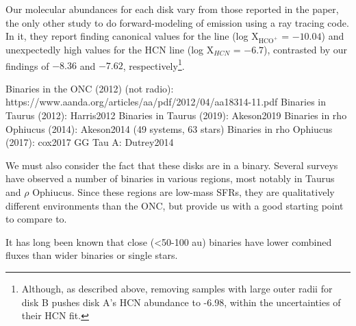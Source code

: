 Our molecular abundances for each disk vary from those reported in the \citet{Factor2017} paper, the only other study to do forward-modeling of \hco emission using a ray tracing code. In it, they report finding canonical values for the \hco line (log X$_{\text{HCO}^+}$ = $-10.04$) and unexpectedly high values for the HCN line (log X$_{HCN}$ = $-6.7$), contrasted by our findings of $-8.36$ and $-7.62$, respectively\footnote{Although, as described above, removing samples with large outer radii for disk B pushes disk A's HCN abundance to -6.98, within the uncertainties of their HCN fit.}.





Binaries in the ONC (2012) (not radio): https://www.aanda.org/articles/aa/pdf/2012/04/aa18314-11.pdf
Binaries in Taurus (2012): Harris2012
Binaries in Taurus (2019): Akeson2019
Binaries in rho Ophiucus (2014): Akeson2014 (49 systems, 63 stars)
Binaries in rho Ophiucus (2017): cox2017
GG Tau A: Dutrey2014



We must also consider the fact that these disks are in a binary. Several surveys have observed a number of binaries in various regions, most notably in Taurus and $\rho$ Ophiucus. Since these regions are low-mass SFRs, they are qualitatively different environments than the ONC, but provide us with a good starting point to compare to.

It has long been known \citep[and references contained therein][]{Jensen1995} that close (\textless50-100 au) binaries have lower combined fluxes than wider binaries or single stars.

